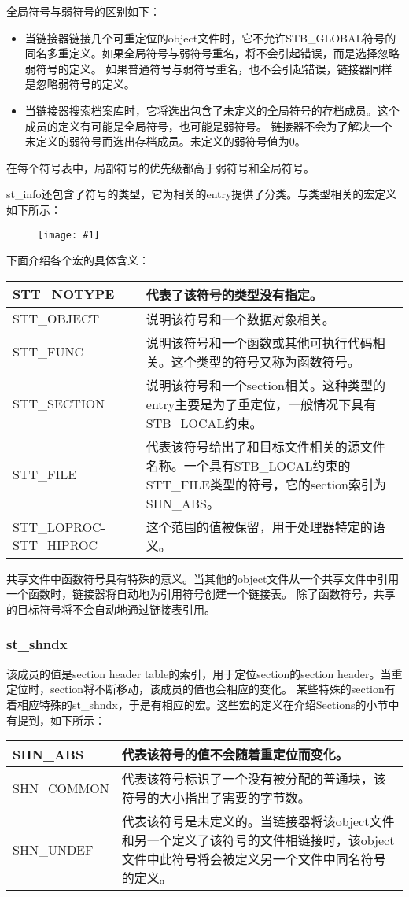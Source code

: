 \documentclass[a4paper,left=2.5cm,right=2.5cm,11pt]{article}
\newcommand{\fic}[1]{\begin{figure}[H]
		\center
		\texttt{[image: \#1]}
	\end{figure}}
\newcommand{\interval}{\vspace{0.5em}}
\begin{document}
	全局符号与弱符号的区别如下：
	\begin{itemize}
		\item 当链接器链接几个可重定位的object文件时，它不允许STB\_GLOBAL符号的同名多重定义。如果全局符号与弱符号重名，将不会引起错误，而是选择忽略弱符号的定义。
			如果普通符号与弱符号重名，也不会引起错误，链接器同样是忽略弱符号的定义。
		\item 当链接器搜索档案库时，它将选出包含了未定义的全局符号的存档成员。这个成员的定义有可能是全局符号，也可能是弱符号。
		链接器不会为了解决一个未定义的弱符号而选出存档成员。未定义的弱符号值为0。
	\end{itemize}

	在每个符号表中，局部符号的优先级都高于弱符号和全局符号。\par

	st\_info还包含了符号的类型，它为相关的entry提供了分类。与类型相关的宏定义如下所示：
	\fic{20.png}

	下面介绍各个宏的具体含义：
	\interval
	\begin{longtable}{p{3cm}p{8cm}}
	\hline
	STT\_NOTYPE & 代表了该符号的类型没有指定。\\
	\hline
	STT\_OBJECT & 说明该符号和一个数据对象相关。\\
	\hline
	STT\_FUNC & 说明该符号和一个函数或其他可执行代码相关。这个类型的符号又称为函数符号。\\
	\hline
	STT\_SECTION & 说明该符号和一个section相关。这种类型的entry主要是为了重定位，一般情况下具有STB\_LOCAL约束。\\
	\hline
	STT\_FILE & 代表该符号给出了和目标文件相关的源文件名称。一个具有STB\_LOCAL约束的STT\_FILE类型的符号，它的section索引为SHN\_ABS。\\
	\hline
	STT\_LOPROC-STT\_HIPROC & 这个范围的值被保留，用于处理器特定的语义。\\
	\hline
	\end{longtable}
	\interval

	共享文件中函数符号具有特殊的意义。当其他的object文件从一个共享文件中引用一个函数时，链接器将自动地为引用符号创建一个链接表。
	除了函数符号，共享的目标符号将不会自动地通过链接表引用。

\subsubsection{st\_shndx}
	该成员的值是section header table的索引，用于定位section的section header。当重定位时，section将不断移动，该成员的值也会相应的变化。
	某些特殊的section有着相应特殊的st\_shndx，于是有相应的宏。这些宏的定义在介绍Sections的小节中有提到，如下所示：
	\interval
	\begin{longtable}{p{3cm}p{7cm}}
	\hline
	SHN\_ABS & 代表该符号的值不会随着重定位而变化。\\
	\hline
	SHN\_COMMON & 代表该符号标识了一个没有被分配的普通块，该符号的大小指出了需要的字节数。\\
	\hline
	SHN\_UNDEF & 代表该符号是未定义的。当链接器将该object文件和另一个定义了该符号的文件相链接时，该object文件中此符号将会被定义另一个文件中同名符号的定义。\\
	\hline
	\end{longtable}
	\interval
\end{document}
